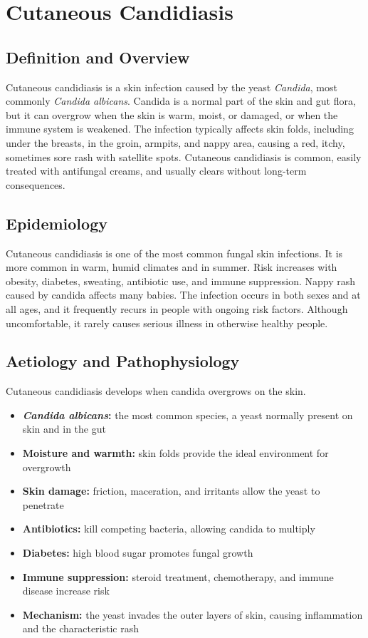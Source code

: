 \chapter{Cutaneous Candidiasis}

\section*{Definition and Overview}
Cutaneous candidiasis is a skin infection caused by the yeast \textit{Candida}, most commonly \textit{Candida albicans}. Candida is a normal part of the skin and gut flora, but it can overgrow when the skin is warm, moist, or damaged, or when the immune system is weakened. The infection typically affects skin folds, including under the breasts, in the groin, armpits, and nappy area, causing a red, itchy, sometimes sore rash with satellite spots. Cutaneous candidiasis is common, easily treated with antifungal creams, and usually clears without long-term consequences.

\section*{Epidemiology}
Cutaneous candidiasis is one of the most common fungal skin infections. It is more common in warm, humid climates and in summer. Risk increases with obesity, diabetes, sweating, antibiotic use, and immune suppression. Nappy rash caused by candida affects many babies. The infection occurs in both sexes and at all ages, and it frequently recurs in people with ongoing risk factors. Although uncomfortable, it rarely causes serious illness in otherwise healthy people.

\section*{Aetiology and Pathophysiology}
Cutaneous candidiasis develops when candida overgrows on the skin.

\begin{itemize}
    \item \textbf{\textit{Candida albicans}:} the most common species, a yeast normally present on skin and in the gut
    \item \textbf{Moisture and warmth:} skin folds provide the ideal environment for overgrowth
    \item \textbf{Skin damage:} friction, maceration, and irritants allow the yeast to penetrate
    \item \textbf{Antibiotics:} kill competing bacteria, allowing candida to multiply
    \item \textbf{Diabetes:} high blood sugar promotes fungal growth
    \item \textbf{Immune suppression:} steroid treatment, chemotherapy, and immune disease increase risk
    \item \textbf{Mechanism:} the yeast invades the outer layers of skin, causing inflammation and the characteristic rash
\end{itemize}

